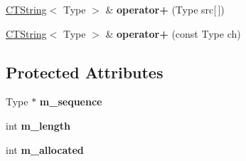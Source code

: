 \begin{DoxyCompactItemize}
\item 
\hypertarget{classps_1_1base_1_1CTString_ae57e15b81a35fc8d26333d134d60ad5a}{}\hyperlink{classps_1_1base_1_1CTString}{C\+T\+String}$<$ Type $>$ \& {\bfseries operator+} (Type src\mbox{[}$\,$\mbox{]})\label{classps_1_1base_1_1CTString_ae57e15b81a35fc8d26333d134d60ad5a}

\item 
\hypertarget{classps_1_1base_1_1CTString_abcb37c51568985b7d9a001902323506f}{}\hyperlink{classps_1_1base_1_1CTString}{C\+T\+String}$<$ Type $>$ \& {\bfseries operator+} (const Type ch)\label{classps_1_1base_1_1CTString_abcb37c51568985b7d9a001902323506f}

\end{DoxyCompactItemize}
\subsection*{Protected Attributes}
\begin{DoxyCompactItemize}
\item 
\hypertarget{classps_1_1base_1_1CTString_a803f0b07cd3dd51054dd2a72da8991f8}{}Type $\ast$ {\bfseries m\+\_\+sequence}\label{classps_1_1base_1_1CTString_a803f0b07cd3dd51054dd2a72da8991f8}

\item 
\hypertarget{classps_1_1base_1_1CTString_a38b923f5f4b539b6b48854908c0ec7aa}{}int {\bfseries m\+\_\+length}\label{classps_1_1base_1_1CTString_a38b923f5f4b539b6b48854908c0ec7aa}

\item 
\hypertarget{classps_1_1base_1_1CTString_a0f221974763517faca7a6c7a00c93c6b}{}int {\bfseries m\+\_\+allocated}\label{classps_1_1base_1_1CTString_a0f221974763517faca7a6c7a00c93c6b}

\end{DoxyCompactItemize}
